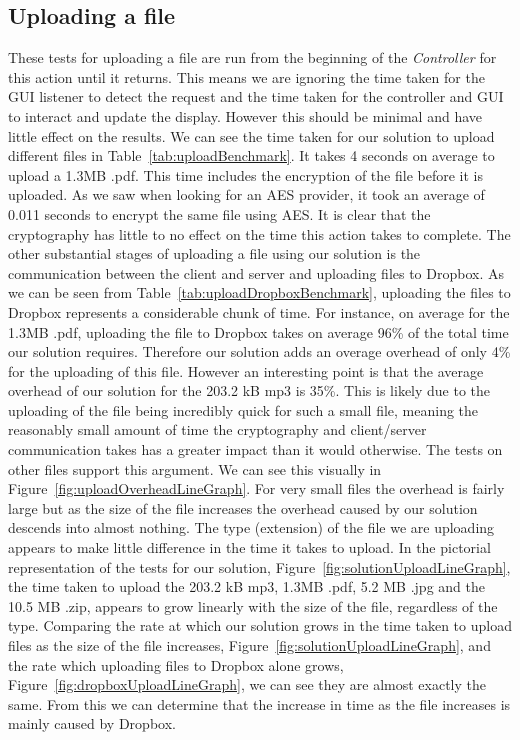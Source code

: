 \documentclass[12pt, titlepage]{article}
\begin{document}
\subsection{Uploading a file}
These tests for uploading a file are run from the beginning of the \textit{Controller} for this action until it returns. This means we are ignoring the time taken for the GUI listener to detect the request and the time taken for the controller and GUI to interact and update the display. However this should be minimal and have little effect on the results.
\newline \indent We can see the time taken for our solution to upload different files in Table~\ref{tab:uploadBenchmark}. It takes 4 seconds on average to upload a 1.3MB .pdf. This time includes the encryption of the file before it is uploaded. As we saw when looking for an AES provider, it took an average of 0.011 seconds to encrypt the same file using AES. It is clear that the cryptography has little to no effect on the time this action takes to complete. The other substantial stages of uploading a file using our solution is the communication between the client and server and uploading files to Dropbox.
\newline \indent As we can be seen from Table~\ref{tab:uploadDropboxBenchmark}, uploading the files to Dropbox represents a considerable chunk of time. For instance, on average for the 1.3MB .pdf, uploading the file to Dropbox takes on average 96\% of the total time our solution requires. Therefore our solution adds an overage overhead of only 4\% for the uploading of this file. However an interesting point is that the average overhead of our solution for the 203.2 kB mp3 is 35\%. This is likely due to the uploading of the file being incredibly quick for such a small file, meaning the reasonably small amount of time the cryptography and client/server communication takes has a greater impact than it would otherwise. The tests on other files support this argument. We can see this visually in Figure~\ref{fig:uploadOverheadLineGraph}. For very small files the overhead is fairly large but as the size of the file increases the overhead caused by our solution descends into almost nothing.
\newline \indent The type (extension) of the file we are uploading appears to make little difference in the time it takes to upload. In the pictorial representation of the tests for our solution, Figure~\ref{fig:solutionUploadLineGraph}, the time taken to upload the 203.2 kB mp3, 1.3MB .pdf, 5.2 MB .jpg and the 10.5 MB .zip, appears to grow linearly with the size of the file, regardless of the type. Comparing the rate at which our solution grows in the time taken to upload files as the size of the file increases, Figure~\ref{fig:solutionUploadLineGraph}, and the rate which uploading files to Dropbox alone grows, Figure~\ref{fig:dropboxUploadLineGraph}, we can see they are almost exactly the same. From this we can determine that the increase in time as the file increases is mainly caused by Dropbox.
\end{document}
